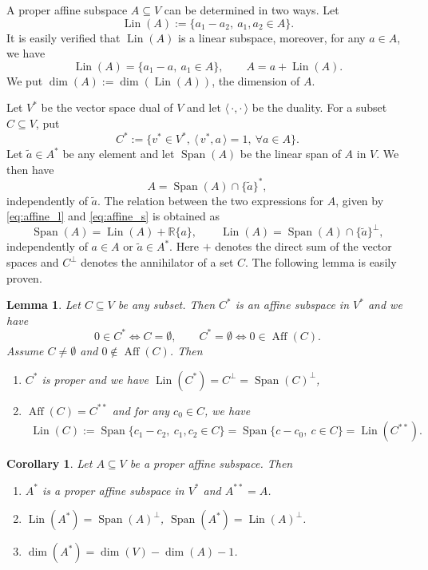 \documentclass[12pt]{article}
\newtheorem{lemma}{Lemma}
\newtheorem{coro}{Corollary}
\theoremstyle{definition}
\theoremstyle{remark}
\def\aff{\operatorname{Aff}}
\def\lin{\operatorname{Lin}}
\def\Span{\operatorname{Span}}
\def\<{\langle\,}
\def\>{\,\rangle}
\begin{document}
A proper  affine subspace $A\subseteq V$ can be determined in two ways. Let 
\[
\lin(A):=\{a_1-a_2,\ a_1,a_2\in A\}.
\]
It is easily verified that $\lin(A)$ is a linear subspace, moreover, for any $a\in A$, we
have
\begin{equation}\label{eq:affine_l}
\lin(A)=\{a_1-a,\ a_1\in A\},\qquad A=a+\lin(A).
\end{equation}
We put $\dim(A):=\dim(\lin(A))$, the dimension of $A$. 

Let $V^*$ be the vector space dual of $V$ and let $\<\cdot,\cdot\>$ be the
duality. For a subset $C\subseteq V$, put
\[
C^*:=\{v^*\in V^*,\ \<v^*,a\>=1,\ \forall a\in A\}.
\]
Let $\tilde a\in A^*$ be any element and let $\Span(A)$ be the linear span of $A$ in
$V$. We then have
\begin{equation}\label{eq:affine_s}
A=\Span(A)\cap \{\tilde a\}^*,
\end{equation}
independently of $\tilde a$. The relation between the two expressions for $A$, given by
\eqref{eq:affine_l} and \eqref{eq:affine_s} is obtained as
\begin{equation}\label{eq:LandS}
\Span(A)=\lin(A)+\mathbb R\{a\},\qquad \lin(A)=\Span(A)\cap \{\tilde a\}^\perp,
\end{equation}
independently of $a\in A$ or $\tilde a\in A^*$. Here $+$ denotes the direct sum of
the vector spaces and $C^\perp$ denotes the annihilator of a set $C$.
The following lemma is  easily proven.

\begin{lemma}\label{lemma:dual} Let $C\subseteq V$ be any subset. Then $C^*$ is an affine subspace in 
$V^*$ and we have
\[
0\in C^* \iff C= \emptyset, \qquad C^*=\emptyset\iff 0\in \aff(C).
\]
Assume $C\ne \emptyset$ and $0\notin \aff(C)$. Then
\begin{enumerate}
\item[(i)] $C^*$ is proper and we have $\lin(C^*)=C^\perp=\Span(C)^\perp$,
\item[(ii)] $\aff(C)=C^{**}$ and for any $c_0\in
C$, we have
\begin{align*}
\lin(C):= \Span\{c_1-c_2,\ c_1,c_2\in C\}=\Span\{c-c_0,\ c\in C\}=\lin(C^{**}).
\end{align*}

\end{enumerate}


\end{lemma}

\begin{coro}\label{coro:dual} Let $A\subseteq V$ be a proper affine subspace. Then 
\begin{enumerate}
\item[(i)] $A^*$ is a proper affine subspace in $V^*$ and $A^{**}=A$.
\item[(ii)] $\lin(A^*)=\Span(A)^\perp$, $\Span(A^*)=\lin(A)^\perp$.
\item[(iii)] $\dim(A^*)=\dim(V)-\dim(A)-1$.
\end{enumerate}


\end{coro}
\end{document}
